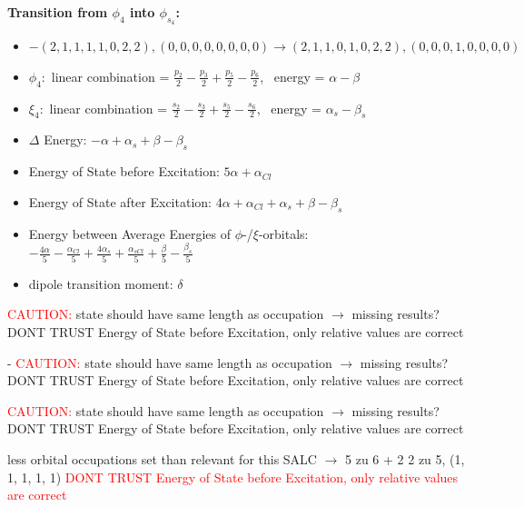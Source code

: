 \documentclass[12pt,a4paper]{article}
\begin{document}
        \noindent\textbf{Transition from $\phi_{4}$ into $\phi_{s_{4}}$:}
        \begin{itemize}
            \item $- (2, 1, 1, 1, 1, 0, 2, 2), (0, 0, 0, 0, 0, 0, 0, 0) \rightarrow (2, 1, 1, 0, 1, 0, 2, 2), (0, 0, 0, 1, 0, 0, 0, 0)$
        
            \item $\phi_{4}:$ linear combination = $\frac{p_{2}}{2} - \frac{p_{3}}{2} + \frac{p_{5}}{2} - \frac{p_{6}}{2}$, \
            energy = $\alpha - \beta$
            
            \item $\xi_{4}:$ linear combination = $\frac{s_{2}}{2} - \frac{s_{3}}{2} + \frac{s_{5}}{2} - \frac{s_{6}}{2}$, \
            energy = $\alpha_{s} - \beta_{s}$
            
            \item $\Delta$ Energy: $- \alpha + \alpha_{s} + \beta - \beta_{s}$
            \item Energy of State before Excitation: $5 \alpha + \alpha_{Cl}$
            \item Energy of State after Excitation: $4 \alpha + \alpha_{Cl} + \alpha_{s} + \beta - \beta_{s}$
            \item Energy between Average Energies of $\phi$-/$\xi$-orbitals: \
            $- \frac{4 \alpha}{5} - \frac{\alpha_{Cl}}{5} + \frac{4 \alpha_{s}}{5} + \frac{\alpha_{s Cl}}{5} + \frac{\beta}{5} - \frac{\beta_{s}}{5}$
        
            \item dipole transition moment: $\delta$
        
        \end{itemize}
        
	\textcolor{red}{CAUTION:} state should have same length as occupation $\rightarrow$ missing results?
	DONT TRUST \glqq{}Energy of State before Excitation\grqq{}, only relative values are correct

 - 	\textcolor{red}{CAUTION:} state should have same length as occupation $\rightarrow$ missing results?
	DONT TRUST \glqq{}Energy of State before Excitation\grqq{}, only relative values are correct

	\textcolor{red}{CAUTION:} state should have same length as occupation $\rightarrow$ missing results?
	DONT TRUST \glqq{}Energy of State before Excitation\grqq{}, only relative values are correct

less orbital occupations set than relevant for this SALC $\rightarrow$ 
5 zu 6 + 2 
2 zu 5, (1, 1, 1, 1, 1) 
\textcolor{red}{DONT TRUST \glqq{}Energy of State before Excitation\grqq{}, only relative values are correct}
\end{document}
